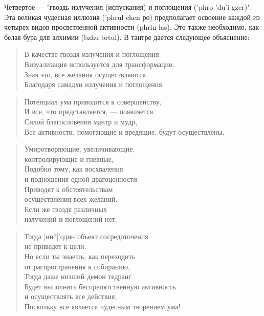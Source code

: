 Четвертое — "гвоздь излучения (испускания) и поглощения ('phro 'du'i gzer)". Эта
великая чудесная иллюзия ('phrul chen ро) предполагает освоение каждой из четырех видов
просветленной активности (phrin las). Это также необходимо, как белая бура для алхимии
(bzhu brtul). В тантре дается следующее объяснение:

\begin{verse}
В качестве гвоздя излучения и поглощения\\
Визуализация используется для трансформации.\\
Зная это, все желания осуществляются.\\
Благодаря самадхи излучения и поглощения.
\end{verse}

\begin{verse}
Потенциал ума приводится к совершенству,\\
И все, что представляется, — появляется.\\
Силой благословения мантр и мудр,\\
Все активности, помогающие и вредящие, будут осуществлены,
\end{verse}

\begin{verse}
Умиротворяющие, увеличивающие, \\
контролирующие и гневные,\\
Подобно тому, как восхваления \\
и подношения одной драгоценности\\
Приводят к обстоятельствам \\
осуществления всех желаний.\\
Если же гвоздя различных \\
излучений и поглощений нет,
\end{verse}

\begin{verse}
Тогда [ни?]་один объект сосредоточения\\
не приведет к цели.\\
Но если ты знаешь, как переходить \\
от распространения к собиранию,\\
Тогда даже низший демон тедранг\\
Будет выполнять беспрепятственную активность \\
и осуществлять все действия,\\
Поскольку все является чудесным творением ума!
\end{verse}

